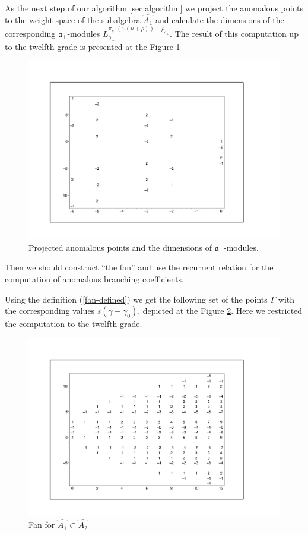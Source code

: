 \documentclass[a4paper,12pt]{article}
\theoremstyle{definition} \newtheorem{Def}{Definition}
\begin{document}
As the next step of our algorithm \ref{sec:algorithm} we project the anomalous points to the weight space of the subalgebra $\hat{A_1}$ and calculate the dimensions of the corresponding $\mathfrak{a}_{\bot}$-modules $L^{\pi_{\mathfrak{a}_{\bot}}(\omega(\mu+\rho))-\rho_{\mathfrak{a}_{\bot}}}_{\mathfrak{a}_{\bot}}$.
The result of this computation up to the twelfth grade is presented at the Figure \ref{fig:AffineA2_A1_anom_proj}
\begin{figure}[h!tb]
  \centering
  \includegraphics[width=150mm]{AffineA2_A1_proj_anom.pdf}
  \caption{Projected anomalous points and the dimensions of $\mathfrak{a}_{\bot}$-modules.}
  \label{fig:AffineA2_A1_anom_proj}
\end{figure}

Then we should construct ``the fan'' and use the recurrent relation for the computation of anomalous branching coefficients.

Using the definition (\ref{fan-defined}) we get the following set of
the points $\Gamma$ with the corresponding values $s(\gamma+\gamma_0)$, depicted at the Figure \ref{fig:AffineA2A1Fan}.
Here we restricted the computation to the twelfth grade.
\begin{figure}[p]
  \centering
  \includegraphics[width=130mm]{AffineA2_A1_fan.pdf}
  \caption{Fan for $\hat{A_1}\subset \hat{A_2}$}
  \label{fig:AffineA2A1Fan}
\end{figure}
\end{document}
